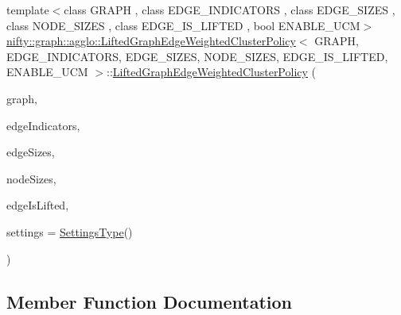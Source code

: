 {\footnotesize\ttfamily template$<$class G\+R\+A\+PH , class E\+D\+G\+E\+\_\+\+I\+N\+D\+I\+C\+A\+T\+O\+RS , class E\+D\+G\+E\+\_\+\+S\+I\+Z\+ES , class N\+O\+D\+E\+\_\+\+S\+I\+Z\+ES , class E\+D\+G\+E\+\_\+\+I\+S\+\_\+\+L\+I\+F\+T\+ED , bool E\+N\+A\+B\+L\+E\+\_\+\+U\+CM$>$ \\
\hyperlink{classnifty_1_1graph_1_1agglo_1_1LiftedGraphEdgeWeightedClusterPolicy}{nifty\+::graph\+::agglo\+::\+Lifted\+Graph\+Edge\+Weighted\+Cluster\+Policy}$<$ G\+R\+A\+PH, E\+D\+G\+E\+\_\+\+I\+N\+D\+I\+C\+A\+T\+O\+RS, E\+D\+G\+E\+\_\+\+S\+I\+Z\+ES, N\+O\+D\+E\+\_\+\+S\+I\+Z\+ES, E\+D\+G\+E\+\_\+\+I\+S\+\_\+\+L\+I\+F\+T\+ED, E\+N\+A\+B\+L\+E\+\_\+\+U\+CM $>$\+::\hyperlink{classnifty_1_1graph_1_1agglo_1_1LiftedGraphEdgeWeightedClusterPolicy}{Lifted\+Graph\+Edge\+Weighted\+Cluster\+Policy} (\begin{DoxyParamCaption}\item[{const \hyperlink{classnifty_1_1graph_1_1agglo_1_1LiftedGraphEdgeWeightedClusterPolicy_a09555efd4d9896f60e2225f905a6600c}{Graph\+Type} \&}]{graph,  }\item[{\hyperlink{classnifty_1_1graph_1_1agglo_1_1LiftedGraphEdgeWeightedClusterPolicy_ad402115dae3b01054a62b0573f84fcab}{Edge\+Indicators\+Type}}]{edge\+Indicators,  }\item[{\hyperlink{classnifty_1_1graph_1_1agglo_1_1LiftedGraphEdgeWeightedClusterPolicy_ad544c54e73b2ce0be17ae1061dcec9ed}{Edge\+Sizes\+Type}}]{edge\+Sizes,  }\item[{\hyperlink{classnifty_1_1graph_1_1agglo_1_1LiftedGraphEdgeWeightedClusterPolicy_aec2d1f0ad4c63bb5847322c094a557cb}{Node\+Sizes\+Type}}]{node\+Sizes,  }\item[{\hyperlink{classnifty_1_1graph_1_1agglo_1_1LiftedGraphEdgeWeightedClusterPolicy_a8294f4c5a6745b1898f9ecf65e486cf6}{Edge\+Is\+Lifted}}]{edge\+Is\+Lifted,  }\item[{const \hyperlink{structnifty_1_1graph_1_1agglo_1_1LiftedGraphEdgeWeightedClusterPolicy_1_1SettingsType}{Settings\+Type} \&}]{settings = {\ttfamily \hyperlink{structnifty_1_1graph_1_1agglo_1_1LiftedGraphEdgeWeightedClusterPolicy_1_1SettingsType}{Settings\+Type}()} }\end{DoxyParamCaption})\hspace{0.3cm}{\ttfamily [inline]}}



\subsection{Member Function Documentation}
\mbox{\label{classnifty_1_1graph_1_1agglo_1_1LiftedGraphEdgeWeightedClusterPolicy_a39565820aad23066cf2cf8daf56c901c}} 
